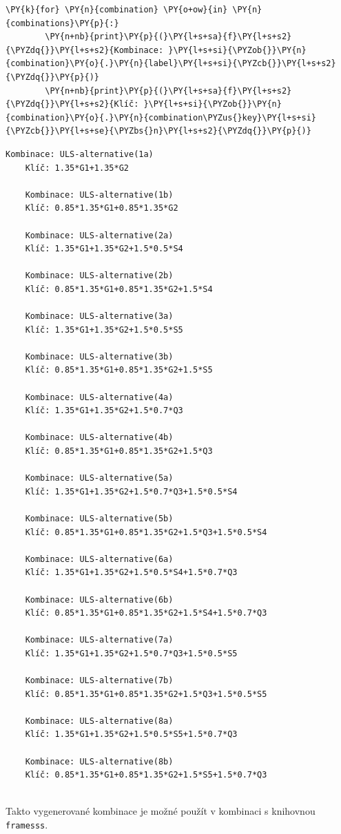         \begin{tcolorbox}[breakable, size=fbox, boxrule=1pt, pad at break*=1mm,colback=cellbackground, colframe=cellborder]
    \begin{Verbatim}[commandchars=\\\{\}]
    \PY{k}{for} \PY{n}{combination} \PY{o+ow}{in} \PY{n}{combinations}\PY{p}{:}
        \PY{n+nb}{print}\PY{p}{(}\PY{l+s+sa}{f}\PY{l+s+s2}{\PYZdq{}}\PY{l+s+s2}{Kombinace: }\PY{l+s+si}{\PYZob{}}\PY{n}{combination}\PY{o}{.}\PY{n}{label}\PY{l+s+si}{\PYZcb{}}\PY{l+s+s2}{\PYZdq{}}\PY{p}{)}
        \PY{n+nb}{print}\PY{p}{(}\PY{l+s+sa}{f}\PY{l+s+s2}{\PYZdq{}}\PY{l+s+s2}{Klíč: }\PY{l+s+si}{\PYZob{}}\PY{n}{combination}\PY{o}{.}\PY{n}{combination\PYZus{}key}\PY{l+s+si}{\PYZcb{}}\PY{l+s+se}{\PYZbs{}n}\PY{l+s+s2}{\PYZdq{}}\PY{p}{)}
    \end{Verbatim}
    \end{tcolorbox}
    
        \begin{Verbatim}[commandchars=\\\{\}]
    Kombinace: ULS-alternative(1a)
    Klíč: 1.35*G1+1.35*G2
    
    Kombinace: ULS-alternative(1b)
    Klíč: 0.85*1.35*G1+0.85*1.35*G2
    
    Kombinace: ULS-alternative(2a)
    Klíč: 1.35*G1+1.35*G2+1.5*0.5*S4
    
    Kombinace: ULS-alternative(2b)
    Klíč: 0.85*1.35*G1+0.85*1.35*G2+1.5*S4
    
    Kombinace: ULS-alternative(3a)
    Klíč: 1.35*G1+1.35*G2+1.5*0.5*S5
    
    Kombinace: ULS-alternative(3b)
    Klíč: 0.85*1.35*G1+0.85*1.35*G2+1.5*S5
    
    Kombinace: ULS-alternative(4a)
    Klíč: 1.35*G1+1.35*G2+1.5*0.7*Q3
    
    Kombinace: ULS-alternative(4b)
    Klíč: 0.85*1.35*G1+0.85*1.35*G2+1.5*Q3
    
    Kombinace: ULS-alternative(5a)
    Klíč: 1.35*G1+1.35*G2+1.5*0.7*Q3+1.5*0.5*S4
    
    Kombinace: ULS-alternative(5b)
    Klíč: 0.85*1.35*G1+0.85*1.35*G2+1.5*Q3+1.5*0.5*S4
    
    Kombinace: ULS-alternative(6a)
    Klíč: 1.35*G1+1.35*G2+1.5*0.5*S4+1.5*0.7*Q3
    
    Kombinace: ULS-alternative(6b)
    Klíč: 0.85*1.35*G1+0.85*1.35*G2+1.5*S4+1.5*0.7*Q3
    
    Kombinace: ULS-alternative(7a)
    Klíč: 1.35*G1+1.35*G2+1.5*0.7*Q3+1.5*0.5*S5
    
    Kombinace: ULS-alternative(7b)
    Klíč: 0.85*1.35*G1+0.85*1.35*G2+1.5*Q3+1.5*0.5*S5
    
    Kombinace: ULS-alternative(8a)
    Klíč: 1.35*G1+1.35*G2+1.5*0.5*S5+1.5*0.7*Q3
    
    Kombinace: ULS-alternative(8b)
    Klíč: 0.85*1.35*G1+0.85*1.35*G2+1.5*S5+1.5*0.7*Q3
    
        \end{Verbatim}

Takto vygenerované kombinace je možné použít v kombinaci s knihovnou \texttt{framesss}.